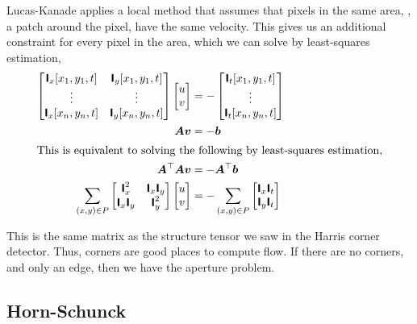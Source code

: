 Lucas-Kanade applies a local method that assumes that pixels in the same
area, \ie, a patch around the pixel, have the same velocity. This gives us an
additional constraint for every pixel in the area, which we can solve by
least-squares estimation,
\begin{align*}
  \begin{bmatrix}
    \bm{\mathsf{I}}_x[x_1,y_1,t] & \bm{\mathsf{I}}_y[x_1,y_1,t] \\
    \vdots & \vdots \\
    \bm{\mathsf{I}}_x[x_n,y_n,t] & \bm{\mathsf{I}}_y[x_n,y_n,t]
  \end{bmatrix}
  \begin{bmatrix}
    u \\ v
  \end{bmatrix}
  &=
  -\begin{bmatrix}
    \bm{\mathsf{I}}_t[x_1,y_1,t] \\
    \vdots \\
    \bm{\mathsf{I}}_t[x_n,y_n,t]
  \end{bmatrix} \\
  \bm{A}\bm{v} &= -\bm{b} \\
  \intertext{This is equivalent to solving the following by least-squares
  estimation,}
  \bm{A}^\top\bm{A}\bm{v} &= -\bm{A}^\top\bm{b} \\
  \sum_{(x,y)\in P}
  \begin{bmatrix}
    \bm{\mathsf{I}}_x^2 & \bm{\mathsf{I}}_x \bm{\mathsf{I}}_y \\
    \bm{\mathsf{I}}_x \bm{\mathsf{I}}_y & \bm{\mathsf{I}}_y^2
  \end{bmatrix}
  \begin{bmatrix}
    u \\ v
  \end{bmatrix}
  &=
  - \sum_{(x,y)\in P}
  \begin{bmatrix}
    \bm{\mathsf{I}}_x \bm{\mathsf{I}}_t \\
    \bm{\mathsf{I}}_y \bm{\mathsf{I}}_t \\
  \end{bmatrix}
\end{align*}

This is the same matrix as the structure tensor we saw in the Harris corner
detector. Thus, corners are good places to compute flow. If there are no
corners, and \eg only an edge, then we have the aperture problem.

\subsection{Horn-Schunck}

